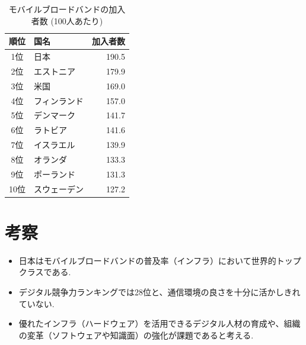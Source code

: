 \documentclass[a4paper,11pt,dvipdfmx]{ujarticle}
\begin{document}
\begin{table}[htbp]
    \centering
    \caption{モバイルブロードバンドの加入者数 (100人あたり) }
    \label{tab:broadband}
    \begin{tabular}{|c|l|r|}
        \hline
        順位 & 国名 & 加入者数 \\ \hline
        1位 & 日本 & 190.5 \\
        2位 & エストニア & 179.9 \\
        3位 & 米国 & 169.0 \\
        4位 & フィンランド & 157.0 \\
        5位 & デンマーク & 141.7 \\
        6位 & ラトビア & 141.6\\
        7位 & イスラエル & 139.9\\
        8位 & オランダ & 133.3\\
        9位 & ポーランド & 131.3\\
        10位 & スウェーデン & 127.2\\ \hline
    \end{tabular}
\end{table}

\section{考察}%
\begin{itemize}
    \item 日本はモバイルブロードバンドの普及率（インフラ）において世界的トップクラスである.
    \item デジタル競争力ランキングでは28位と、通信環境の良さを十分に活かしきれていない.
    \item 優れたインフラ（ハードウェア）を活用できるデジタル人材の育成や、組織の変革（ソフトウェアや知識面）の強化が課題であると考える.
\end{itemize}

%


\end{document}
